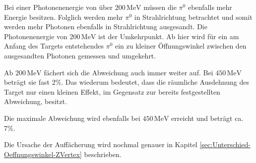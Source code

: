 \documentclass[a4paper,11pt,oneside,final,german,openbib,pdftex]{scrbook}
\begin{document}
{Bei einer Photonenenergie von \"uber $200\,\text{MeV}$ m\"ussen die $\pi^0$ ebenfalls mehr Energie besitzen. Folglich werden mehr $\pi^0$ in Strahlrichtung betrachtet und somit werden mehr Photonen ebenfalls in Strahlrichtung ausgesandt. Die Photonenenergie von $200\, \text{MeV}$ ist der Umkehrpunkt.
Ab hier wird f\"ur ein am Anfang des Targets entstehendes $\pi^0$ ein zu kleiner \"Offnungswinkel zwischen den ausgesandten Photonen gemessen und umgekehrt.

Ab $200\,\text{MeV}$ f\"achert sich die Abweichung auch immer weiter auf. Bei $450\,\text{MeV}$ betr\"agt sie fast 2\%. Das wiederum bedeutet, dass die r\"aumliche Ausdehnung des Target nur einen kleinen Effekt, im Gegensatz zur bereits festgestellten Abweichung, besitzt.

Die maximale Abweichung wird ebenfalls bei $450\,\text{MeV}$ erreicht und betr\"agt ca. 7\%.

Die Ursache der Auff\"acherung wird nochmal genauer in Kapitel \ref{sec:Unterschied-Oeffnungswinkel-ZVertex} beschrieben.

}
\end{document}
